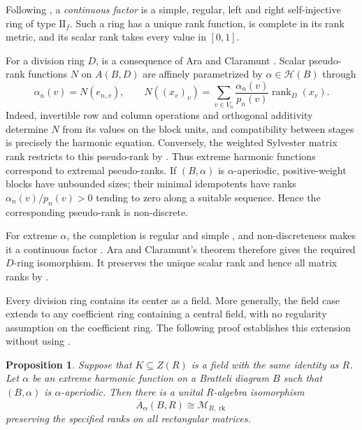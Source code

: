 \documentclass[11pt]{amsart}
\DeclareMathOperator{\rk}{rk}
\newtheorem{proposition}[theorem]{Proposition}
\theoremstyle{definition}
\theoremstyle{remark}
\begin{document}
Following \cite[Section~2]{AraClaramunt2018}, a \emph{continuous factor}
is a simple, regular, left and right self-injective ring of type
$\mathrm{II}_f$.  Such a ring has a unique rank function, is complete
in its rank metric, and its scalar rank takes every value in $[0,1]$.

For a division ring $D$,  is a consequence of
Ara and Claramunt \cite[Theorem~3.2]{AraClaramunt2018}.
Scalar pseudo-rank functions $N$ on $A(B,D)$ are affinely parametrized
by $\alpha\in\mathcal H(B)$ through
\[
 \alpha_n(v)=N(e_{n,v}),\qquad
 N((x_v)_v)=\sum_{v\in V_n}\frac{\alpha_n(v)}{p_n(v)}
                   \operatorname{rank}_D(x_v).
\]
Indeed, invertible row and column operations and orthogonal additivity
determine $N$ from its values on the block units, and compatibility
between stages is precisely the harmonic equation.
Conversely, the weighted Sylvester matrix rank restricts to this
pseudo-rank by .
Thus extreme harmonic functions correspond to extremal pseudo-ranks.
If $(B,\alpha)$ is $\alpha$-aperiodic, positive-weight blocks have
unbounded sizes; their minimal idempotents have ranks
$\alpha_n(v)/p_n(v)>0$ tending to zero along a suitable sequence.
Hence the corresponding pseudo-rank is non-discrete.

For extreme $\alpha$, the completion is regular and simple
\cite[Theorems~19.6 and 19.14]{Goodearl1991}, and non-discreteness
makes it a continuous factor \cite[Lemma~3(i)]{Halperin1968}.
Ara and Claramunt's theorem therefore gives the required $D$-ring
isomorphism.  It preserves the unique scalar rank and hence all matrix
ranks by .

Every division ring contains its center as a field.  More generally,
the field case extends to any coefficient ring containing a central
field, with no regularity assumption on the coefficient ring.
The following proof establishes this extension without using
.

\begin{proposition}
\label{prop:central-field-transfer}
Suppose that $K\subseteq Z(R)$ is a field with the same identity as $R$.
Let $\alpha$ be an extreme harmonic function on a Bratteli diagram $B$
such that $(B,\alpha)$ is $\alpha$-aperiodic.  Then there is a unital
$R$-algebra isomorphism
\[
 \overline A_\alpha(B,R)\cong\mathcal M_{R,\rk}
\]
preserving the specified ranks on all rectangular matrices.
\end{proposition}
\end{document}
